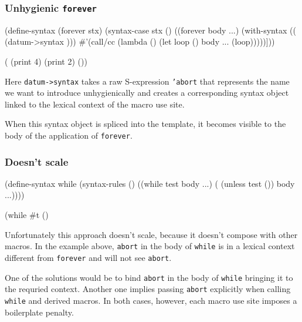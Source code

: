 \documentclass[hyperref={bookmarks=false}]{beamer}
\begin{document}
\begin{frame}[fragile]
\frametitle{Unhygienic \texttt{forever}}

\begin{lstlistinglike}
\begin{semiverbatim}
(define-syntax (forever stx)
  (syntax-case stx ()
    ((forever body ...)
     (with-syntax ((\text{\color{blue}{abort}} (datum->syntax \text{\color{blue}{#'forever}} \text{\color{red}{'abort}})))
       #'(call/cc (lambda (\text{\color{blue}{abort}})
                    (let loop () body ... (loop)))))]))

(\text{\color{blue}{forever}} (print 4) (print 2) (\text{\color{blue}{abort}}))
\end{semiverbatim}
\end{lstlistinglike}

Here \texttt{datum->syntax} takes a raw S-expression \texttt{'abort} that represents the name
we want to introduce unhygienically and creates a corresponding syntax object linked to the
lexical context of the macro use site.

When this syntax object is spliced into the template, it becomes visible to the body
of the application of \texttt{forever}.
\end{frame}

\begin{frame}[fragile]
\frametitle{Doesn't scale}

\begin{lstlistinglike}
\begin{semiverbatim}
(define-syntax while
  (syntax-rules ()
    ((while test body ...)
     (\text{\color{blue}{forever}} (unless test (\text{\color{blue}{abort}})) body ...))))

(while #t (\text{\color{red}{abort}})
\end{semiverbatim}
\end{lstlistinglike}

Unfortunately this approach doesn't scale, because it doesn't compose with other macros.
In the example above, \texttt{abort} in the body of \texttt{while} is in a lexical context
different from \texttt{forever} and will not see \texttt{abort}.

One of the solutions would be to bind \texttt{abort} in the body of \texttt{while} bringing it to the
requried context. Another one implies passing \texttt{abort} explicitly when calling \texttt{while} and
derived macros. In both cases, however, each macro use site imposes a boilerplate penalty.
\end{frame}
\end{document}
